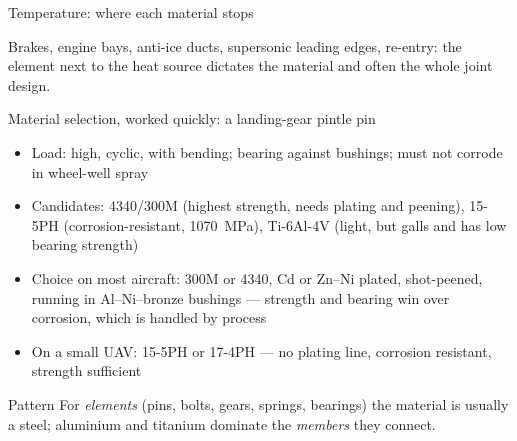 \documentclass[aspectratio=169,10pt]{beamer}
\begin{document}
\begin{frame}{Temperature: where each material stops}
\centering
{}
\vspace{4pt}

\small Brakes, engine bays, anti-ice ducts, supersonic leading edges, re-entry: the element next to the heat source dictates the material and often the whole joint design.
\end{frame}

\begin{frame}{Material selection, worked quickly: a landing-gear pintle pin}
\begin{itemize}
  \item Load: high, cyclic, with bending; bearing against bushings; must not corrode in wheel-well spray
  \item Candidates: 4340/300M (highest strength, needs plating and peening), 15-5PH (corrosion-resistant, \SI{1070}{MPa}), Ti-6Al-4V (light, but galls and has low bearing strength)
  \item Choice on most aircraft: \alert{300M or 4340, Cd or Zn--Ni plated, shot-peened}, running in Al--Ni--bronze bushings --- strength and bearing win over corrosion, which is handled by process
  \item On a small UAV: 15-5PH or 17-4PH --- no plating line, corrosion resistant, strength sufficient
\end{itemize}
\begin{block}{Pattern}
For \emph{elements} (pins, bolts, gears, springs, bearings) the material is usually a steel; aluminium and titanium dominate the \emph{members} they connect.
\end{block}
\end{frame}
\end{document}
